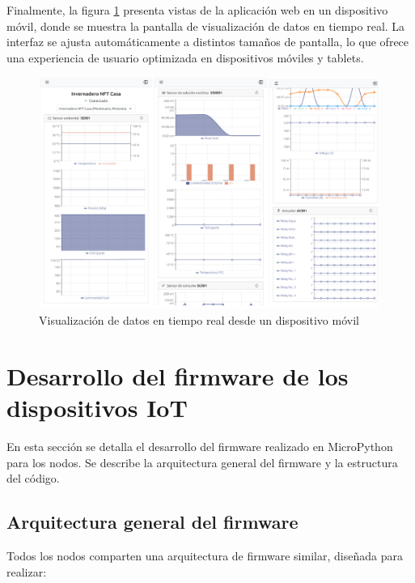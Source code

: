 Finalmente, la figura \ref{fig:dashboard_celular} presenta vistas de la
aplicación web en un dispositivo móvil, donde se muestra la pantalla de
visualización de datos en tiempo real. La interfaz se ajusta automáticamente a
distintos tamaños de pantalla, lo que ofrece una experiencia de usuario
optimizada en dispositivos móviles y tablets.

\begin{figure}[H]
    \centering
    \includegraphics[width=0.99\textwidth]{./Images/29_dashboard_celular.png}
    \caption{Visualización de datos en tiempo real desde un dispositivo móvil}
    \label{fig:dashboard_celular}
\end{figure}

\section{Desarrollo del firmware de los dispositivos IoT}

En esta sección se detalla el desarrollo del firmware realizado en MicroPython
para los nodos. Se describe la arquitectura general del firmware y la
estructura del código.

\subsection{Arquitectura general del firmware}

Todos los nodos comparten una arquitectura de firmware similar, diseñada para
realizar:

